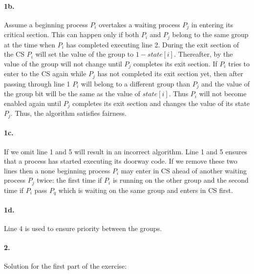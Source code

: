 \paragraph{1b.}
Assume a beginning process $P_i$ overtakes a waiting process $P_j$ in
entering its critical section.  This can happen only if both $P_i$ and
$P_j$ belong to the same group at the time when $P_i$ has completed
executing line 2.  During the exit section of the CS $P_i$ will set
the value of the group to $1 - state[i]$.  Thereafter, by the
value of the group will not change until $P_j$ completes its exit
section.  If $P_i$ tries to enter to the CS again while $P_j$ has not
completed its exit section yet, then after passing through line 1
$P_i$ will belong to a different group than $P_j$ and the value of the
group bit will be the same as the value of $state[i]$. Thus $P_i$ will
not become enabled again until $P_j$ completes its exit section and
changes the value of its state $P_j$. Thus, the algorithm satisfies
fairness.

\paragraph{1c.}
If we omit line 1 and 5 will result in an incorrect algorithm. Line 1
and 5 ensures that a process has started executing its doorway code.
If we remove these two lines then a none beginning process $P_i$ may
enter in CS ahead of another waiting process $P_j$ twice: the first
time if $P_i$ is running on the other group and the second time if
$P_i$ pass $P_q$ which is waiting on the same group and enters in CS
first.

\paragraph{1d.}
Line 4 is used to ensure priority between the groups.

\paragraph{2.}
Solution for the first part of the exercise:

